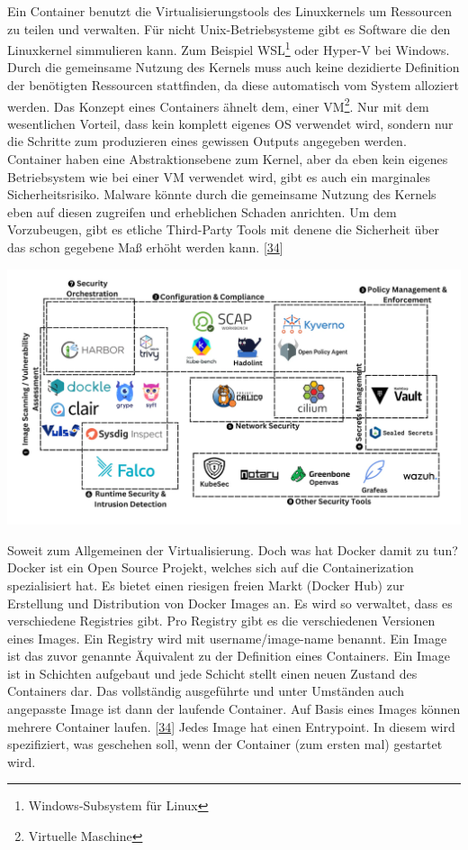 \documentclass[
    headings=optiontotocandhead,%
    twoside,
    numbers=noenddot,%
    12pt, %
    titlepage, %
    parskip=full, %
    listof=leveldown, 
    numbers=noenddot, %
    a4paper,DIV=14,
    BCOR=15mm,
]{scrbook}
\let\origfigure=\figure
\let\endorigfigure=\endfigure
\renewenvironment{figure}[1][]{%
   \origfigure[H]
}{%
   \endorigfigure
}
\begin{document}
Ein Container benutzt die Virtualisierungstools des Linuxkernels um
Ressourcen zu teilen und verwalten. Für nicht Unix-Betriebsysteme gibt
es Software die den Linuxkernel simmulieren kann. Zum Beispiel
WSL\footnote{Windows-Subsystem für Linux} oder Hyper-V bei Windows.
Durch die gemeinsame Nutzung des Kernels muss auch keine dezidierte
Definition der benötigten Ressourcen stattfinden, da diese automatisch
vom System alloziert werden. Das Konzept eines Containers ähnelt dem,
einer VM\footnote{Virtuelle Maschine}. Nur mit dem wesentlichen Vorteil,
dass kein komplett eigenes OS verwendet wird, sondern nur die Schritte
zum produzieren eines gewissen Outputs angegeben werden. Container haben
eine Abstraktionsebene zum Kernel, aber da eben kein eigenes
Betriebsystem wie bei einer VM verwendet wird, gibt es auch ein
marginales Sicherheitsrisiko. Malware könnte durch die gemeinsame
Nutzung des Kernels eben auf diesen zugreifen und erheblichen Schaden
anrichten. Um dem Vorzubeugen, gibt es etliche Third-Party Tools mit
denene die Sicherheit über das schon gegebene Maß erhöht werden kann.
{[}\protect\hyperlink{ref-ibm-docker}{34}{]}

\begin{figure}
\centering
\includegraphics[width=1\textwidth,height=\textheight]{img/Schrempf/container-security-tools.png}
\caption{Übersicht von Container Security Tools
{[}\protect\hyperlink{ref-docker-security}{35}{]}}
\end{figure}

Soweit zum Allgemeinen der Virtualisierung. Doch was hat Docker damit zu
tun? Docker ist ein Open Source Projekt, welches sich auf die
Containerization spezialisiert hat. Es bietet einen riesigen freien
Markt (Docker Hub) zur Erstellung und Distribution von Docker Images an.
Es wird so verwaltet, dass es verschiedene Registries gibt. Pro Registry
gibt es die verschiedenen Versionen eines Images. Ein Registry wird mit
username/image-name benannt. Ein Image ist das zuvor genannte Äquivalent
zu der Definition eines Containers. Ein Image ist in Schichten aufgebaut
und jede Schicht stellt einen neuen Zustand des Containers dar. Das
vollständig ausgeführte und unter Umständen auch angepasste Image ist
dann der laufende Container. Auf Basis eines Images können mehrere
Container laufen. {[}\protect\hyperlink{ref-ibm-docker}{34}{]} Jedes
Image hat einen Entrypoint. In diesem wird spezifiziert, was geschehen
soll, wenn der Container (zum ersten mal) gestartet wird.
\end{document}
